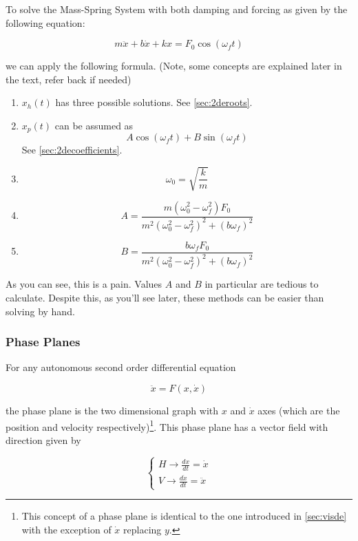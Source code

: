 \documentclass[12pt, landscape, twocolumn]{article}
\begin{document}
        To solve the Mass-Spring System with both damping and forcing as given by the following equation:

            \[
                m \ddot{x} + b\dot{x} + kx = F_0 \cos ( \omega_f t )
            \]

        we can apply the following formula. (Note, some concepts are explained later in the text, refer back if needed)

        \begin{enumerate}
            \item $x_h(t)$ has three possible solutions. See \eqref{sec:2deroots}.
            \item $x_p(t)$ can be assumed as
                \[ A \cos ( \omega_f t ) + B \sin ( \omega_f t )\]
                See \eqref{sec:2decoefficients}.
            \item \[ \omega_0 = \sqrt{\frac{k}{m} } \]
            \item \[ A = \frac{m (\omega_0^2 - \omega_f^2) F_0}{m^2{(\omega_0^2 - \omega_f^2)}^2 + {(b \omega_f)}^2} \]
            \item \[ B = \frac{b \omega_f F_0}{m^2{(\omega_0^2 - \omega_f^2)}^2 + {(b \omega_f)}^2} \]
        \end{enumerate}

        As you can see, this is a pain. Values $A$ and $B$ in particular are tedious to calculate. Despite this, as you'll see later, these methods can be easier than solving by hand.

        \subsubsection{Phase Planes}\label{sec:2depplane}
        For any autonomous second order differential equation

            \[ \ddot{x} = F(x, \dot{x}) \]

        the phase plane is the two dimensional graph with $x$ and $\dot{x}$ axes (which are the position and velocity respectively)\footnote{This concept of a phase plane is identical to the one introduced in \eqref{sec:visde} with the exception of $\dot{x}$ replacing $y$.}. This phase plane has a vector field with direction given by

            \[ \begin{cases}
                    H \to \frac{dx}{dt} = \dot{x}\\
                    V \to \frac{d\dot{x} }{dt} = \ddot{x}
                \end{cases} \]
\end{document}
